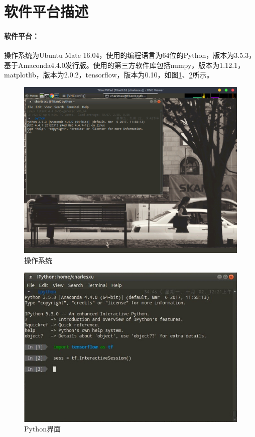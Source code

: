 \documentclass{exam}
\begin{document}
\newpage
\section{软件平台描述}
\paragraph{软件平台：}操作系统为Ubuntu Mate 16.04，使用的编程语言为64位的Python，版本为3.5.3，基于Amaconda4.4.0发行版。使用的第三方软件库包括numpy，版本为1.12.1，matplotlib，版本为2.0.2，tensorflow，版本为0.10，如图\ref{os}、\ref{py}所示。



\begin{figure}[h]
\centering
\includegraphics[width=0.8\hsize]{fig/os.png}
\caption{操作系统}
\label{os}
\end{figure}

\begin{figure}[h]
\centering
\includegraphics[width=0.8\hsize]{fig/python.jpg}
\caption{Python界面}
\label{py}
\end{figure}
\end{document}
